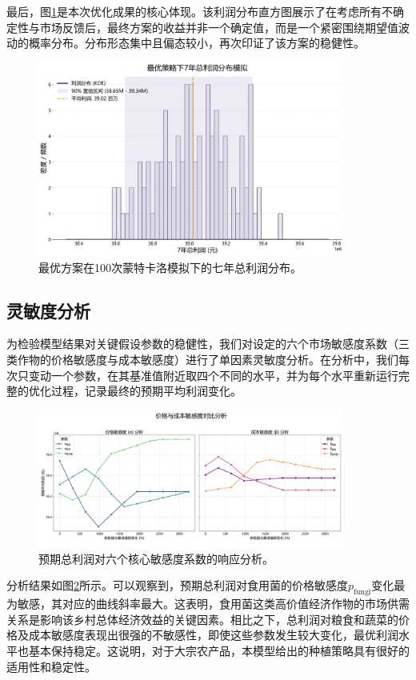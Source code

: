 最后，图\ref{fig:profit_dist}是本次优化成果的核心体现。该利润分布直方图展示了在考虑所有不确定性与市场反馈后，最终方案的收益并非一个确定值，而是一个紧密围绕期望值波动的概率分布。分布形态集中且偏态较小，再次印证了该方案的稳健性。

\begin{figure}[H]
    \centering
    \includegraphics[width=0.9\textwidth]{figs/5问题三/利润分布图.png}
    \caption{最优方案在100次蒙特卡洛模拟下的七年总利润分布。}
    \label{fig:profit_dist}
\end{figure}

\subsection{灵敏度分析}
为检验模型结果对关键假设参数的稳健性，我们对设定的六个市场敏感度系数（三类作物的价格敏感度与成本敏感度）进行了单因素灵敏度分析。在分析中，我们每次只变动一个参数，在其基准值附近取四个不同的水平，并为每个水平重新运行完整的优化过程，记录最终的预期平均利润变化。

\begin{figure}[H]
    \centering
    \includegraphics[width=0.9\textwidth]{figs/5问题三/灵敏度分析图.png}
    \caption{预期总利润对六个核心敏感度系数的响应分析。}
    \label{fig:sensitivity_analysis}
\end{figure}

分析结果如图\ref{fig:sensitivity_analysis}所示。可以观察到，预期总利润对食用菌的价格敏感度$p_{\text{fungi}}$变化最为敏感，其对应的曲线斜率最大。这表明，食用菌这类高价值经济作物的市场供需关系是影响该乡村总体经济效益的关键因素。相比之下，总利润对粮食和蔬菜的价格及成本敏感度表现出很强的不敏感性，即使这些参数发生较大变化，最优利润水平也基本保持稳定。这说明，对于大宗农产品，本模型给出的种植策略具有很好的适用性和稳定性。

